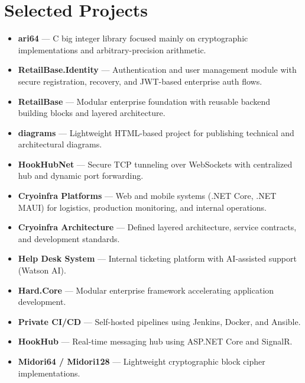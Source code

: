 \section*{Selected Projects}

\begin{itemize}[leftmargin=12pt]
    \item \textbf{ari64} — C big integer library focused mainly on cryptographic implementations and arbitrary-precision arithmetic.
    \item \textbf{RetailBase.Identity} — Authentication and user management module with secure registration, recovery, and JWT-based enterprise auth flows.
    \item \textbf{RetailBase} — Modular enterprise foundation with reusable backend building blocks and layered architecture.
    \item \textbf{diagrams} — Lightweight HTML-based project for publishing technical and architectural diagrams.
    \item \textbf{HookHubNet} — Secure TCP tunneling over WebSockets with centralized hub and dynamic port forwarding.
    \item \textbf{Cryoinfra Platforms} — Web and mobile systems (.NET Core, .NET MAUI) for logistics, production monitoring, and internal operations.
    \item \textbf{Cryoinfra Architecture} — Defined layered architecture, service contracts, and development standards.
    \item \textbf{Help Desk System} — Internal ticketing platform with AI-assisted support (Watson AI).
    \item \textbf{Hard.Core} — Modular enterprise framework accelerating application development.
    \item \textbf{Private CI/CD} — Self-hosted pipelines using Jenkins, Docker, and Ansible.
    \item \textbf{HookHub} — Real-time messaging hub using ASP.NET Core and SignalR.
    \item \textbf{Midori64 / Midori128} — Lightweight cryptographic block cipher implementations.
\end{itemize}
